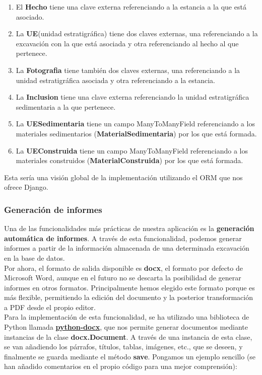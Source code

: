         \begin{enumerate}
            \item El \textbf{Hecho} tiene una clave externa referenciando a la estancia a la
            que está asociado.
            \item La \textbf{UE}(unidad estratigráfica) tiene dos claves externas, una
            referenciando a la excavación con la que está asociada y otra referenciando al
            hecho al que pertenece.
            \item La \textbf{Fotografia} tiene también dos claves externas, una referenciando
            a la unidad estratigráfica asociada y otra referenciando a la estancia.
            \item La \textbf{Inclusion} tiene una clave externa referenciando la unidad
            estratigráfica sedimentaria a la que pertenece.
            \item La \textbf{UESedimentaria} tiene un campo ManyToManyField referenciando a
            los materiales sedimentarios (\textbf{MaterialSedimentaria}) por los que está
            formada.
            \item La \textbf{UEConstruida} tiene un campo ManyToManyField referenciando a
            los materiales construidos (\textbf{MaterialConstruida}) por los que está
            formada.
        \end{enumerate}

    Esta sería una visión global de la implementación utilizando el ORM que nos ofrece Django.

\subsubsection{Generación de informes}
Una de las funcionalidades más prácticas de nuestra aplicación es la \textbf{generación
automática de informes}. A través de esta funcionalidad, podemos generar informes a partir
de la información almacenada de una determinada excavación en la base de datos. \\

Por ahora, el formato de salida disponible es \textbf{docx}, el formato por defecto de
Microsoft Word, aunque en el futuro no se descarta la posibilidad de generar informes
en otros formatos. Principalmente hemos elegido este formato porque es más flexible,
permitiendo la edición del documento y la posterior transformación a PDF desde el propio
editor. \\

Para la implementación de esta funcionalidad, se ha utilizado una biblioteca de Python
llamada \href{https://python-docx.readthedocs.io/en/latest/}{\textbf{python-docx}}, que nos
permite generar documentos mediante instancias de la clase \textbf{docx.Document}. A
través de una instancia de esta clase, se van añadiendo los párrafos, títulos, tablas,
imágenes, etc., que se deseen, y finalmente se guarda mediante el método \textbf{save}.
Pongamos un ejemplo sencillo (se han añadido comentarios en el propio código para una mejor
comprensión):


